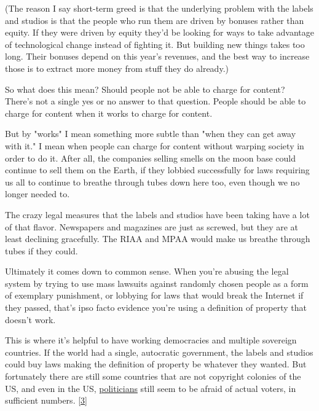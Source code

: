 (The
                  reason I say short-term greed is that the underlying problem
                  with the labels and studios is that the people who run them
                  are driven by bonuses rather than equity. If they were driven
                  by equity they'd be looking for ways to take advantage of
                  technological change instead of fighting it. But building new
                  things takes too long. Their bonuses depend on this year's
                  revenues, and the best way to increase those is to extract
                  more money from stuff they do already.)

So what
                  does this mean? Should people not be able to charge for
                  content? There's not a single yes or no answer to that
                  question. People should be able to charge for content when it
                  works to charge for content.

But by "works" I mean
                  something more subtle than "when they can get away with it." I
                  mean when people can charge for content without warping
                  society in order to do it. After all, the companies selling
                  smells on the moon base could continue to sell them on the
                  Earth, if they lobbied successfully for laws requiring us all
                  to continue to breathe through tubes down here too, even
                  though we no longer needed to.

The crazy legal
                  measures that the labels and studios have been taking have a
                  lot of that flavor. Newspapers and magazines are just as
                  screwed, but they are at least declining gracefully. The RIAA
                  and MPAA would make us breathe through tubes if they could.

Ultimately
                  it comes down to common sense. When you're abusing the legal
                  system by trying to use mass lawsuits against randomly chosen
                  people as a form of exemplary punishment, or lobbying for laws
                  that would break the Internet if they passed, that's ipso
                  facto evidence you're using a definition of property that
                  doesn't work.

This is where it's helpful to have
                  working democracies and multiple sovereign countries. If the
                  world had a single, autocratic government, the labels and
                  studios could buy laws making the definition of property be
                  whatever they wanted. But fortunately there are still some
                  countries that are not copyright colonies of the US, and even
                  in the US,
                  \href{http://tctechcrunch2011.files.wordpress.com/2012/01/congress-on-sopa-done.png}{politicians}
                  still seem to be afraid of actual voters, in sufficient
                  numbers.
                  [\href{\#f3n}{3}]


